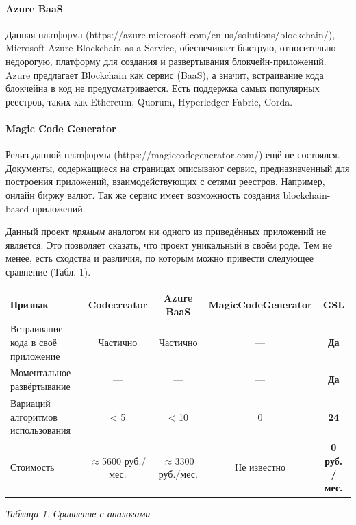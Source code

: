 \paragraph{Azure BaaS}
Данная платформа (https://azure.microsoft.com/en-us/solutions/blockchain/),
Microsoft Azure Blockchain as a Service, обеспечивает быструю, относительно
недорогую, платформу для создания и развертывания блокчейн-приложений. Azure
предлагает Blockchain как сервис (BaaS), а значит, встраивание кода блокчейна в
код не предусматривается. Есть поддержка самых популярных реестров, таких как
Ethereum, Quorum, Hyperledger Fabric, Corda.

\paragraph{Magic Code Generator}
Релиз данной платформы (https://magiccodegenerator.com/) ещё не состоялся.
Документы, содержащиеся на страницах описывают сервис, предназначенный для
построения приложений, взаимодействующих с сетями реестров. Например, онлайн
биржу валют. Так же сервис имеет возможность создания blockchain-based
приложений.


Данный проект \emph{прямым} аналогом ни одного из приведённых приложений не
является. Это позволяет сказать, что проект уникальный в своём роде. Тем не
менее, есть сходства и различия, по которым можно привести следующее сравнение
(Табл. 1).

\begin{center}
    \begin{tabular}{ | p{4cm} | c | c | c | c | }
    \hline
    \hline
      Признак & Codecreator & Azure BaaS & MagicCodeGenerator\footnotemark & \textbf{GSL} \\ \hline
      Встраивание кода в своё приложение & Частично & Частично & --- & \textbf{Да} \\ \hline
      Моментальное развёртывание & --- & --- & --- & \textbf{Да} \\ \hline
      Вариаций алгоритмов использования & < 5 & < 10 & 0 & \textbf{24} \\ \hline
      Стоимость & $\approx$5600 руб./мес. & $\approx$3300 руб./мес. & Не известно & \textbf{0 руб. / мес.} \\ \hline
    \hline
  \end{tabular}

    \vspace{-5cm} \hfill \emph{Таблица 1. Сравнение с аналогами} \vspace{5cm}
\end{center}

